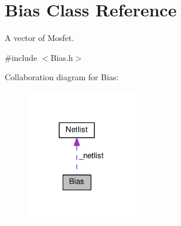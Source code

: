 \hypertarget{classBias}{}\section{Bias Class Reference}
\label{classBias}


A vector of Mosfet.  




{\ttfamily \#include $<$Bias.\+h$>$}



Collaboration diagram for Bias\+:
\nopagebreak
\begin{figure}[H]
\begin{center}
\leavevmode
\includegraphics[width=138pt]{classBias__coll__graph}
\end{center}
\end{figure}
